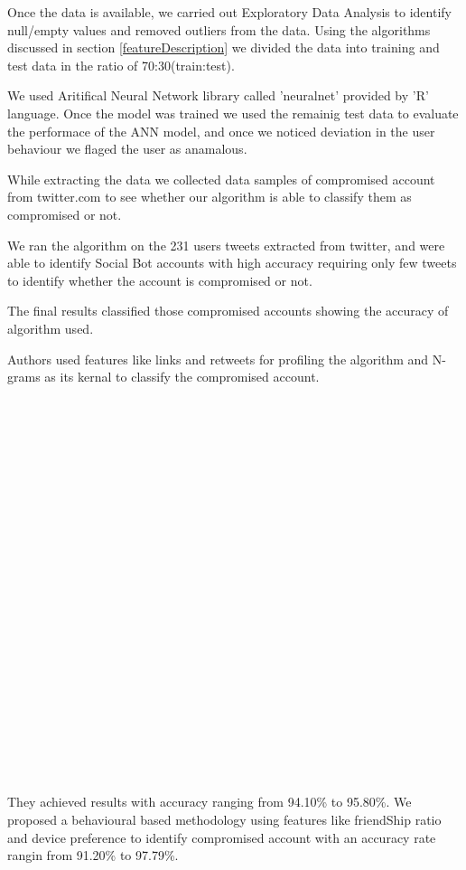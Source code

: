 \documentclass[conference]{IEEEtran}
\begin{document}
	  Once the data is available, we carried out Exploratory Data Analysis to identify null/empty values and removed outliers from the data. 
	  Using the algorithms discussed in section \ref{featureDescription} we divided the data into training and test data in the ratio of 70:30(train:test).

	  We used Aritifical Neural Network library called 'neuralnet' provided by 'R' language. 
	  Once the model was trained we used the remainig test data to evaluate the performace of the ANN model, 
	  and once we noticed deviation in the user behaviour we flaged the user as anamalous.
	
	  While extracting the data we collected data samples of compromised account from twitter.com to see 
	  whether our algorithm is able to classify them as compromised or not. 
	  
	  We ran the algorithm on the 231 users tweets extracted from twitter, and were able to identify Social Bot accounts 
	  with high accuracy requiring only few tweets to identify whether the account is compromised or not.
	 
	  The final results classified those compromised accounts showing the accuracy of algorithm used.
	  
	  Authors\cite{12} used features like links and retweets for profiling the algorithm and N-grams as its kernal to classify the compromised account.\\\\\\\\\\\\\\\\\\\\\\\\\\\\\\\\\\\\\\\\\\\\\\\\
	   They achieved results with accuracy ranging  from 94.10\% to 95.80\%. We proposed a behavioural based methodology using features like friendShip ratio 
	   and device preference to identify compromised account with an accuracy rate rangin from 91.20\% to 97.79\%.
 
\end{document}
